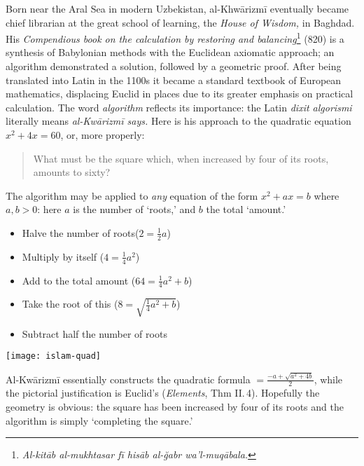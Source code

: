 	
Born near the Aral Sea in modern Uzbekistan, al-Khwārizmī eventually became chief librarian at the great school of learning, the \emph{House of Wisdom,} in Baghdad. His \emph{Compendious book on the calculation by restoring and balancing}\footnote{\emph{Al-kitāb al-mukhtasar fī hisāb al-ğabr wa’l-muqābala.}} (820) is a synthesis of Babylonian methods with the Euclidean axiomatic approach; an algorithm demonstrated a solution, followed by a geometric proof. After being translated into Latin in the 1100s it became a standard textbook of European mathematics, displacing Euclid in places due to its greater emphasis on practical calculation. The word \emph{algorithm} reflects its importance: the Latin \emph{dixit algorismi} literally means \emph{al-Kwārizmī says.} Here is his approach to the quadratic equation $x^2+4x=60$, or, more properly:
\begin{quote}
What must be the square which, when increased by four of its roots, amounts to sixty?
\end{quote}


\begin{minipage}[t]{0.7\linewidth}\vspace{-4pt}
The algorithm may be applied to \emph{any} equation of the form $x^2+ax=b$ where $a,b>0$: here $a$ is the number of `roots,' and $b$ the total `amount.'
\begin{itemize}\itemsep0pt
  \item Halve the number of roots\hfill \big($2=\frac 12a$\big)
  \item Multiply by itself \hfill \big($4=\frac 14a^2$\big)
  \item Add to the total amount \hfill \big($64=\frac 14a^2+b$\big)
  \item Take the root of this \hfill \Big($8=\sqrt{\frac 14a^2+b}$\Big)
  \item Subtract half the number of roots \hfill {}
\end{itemize}
\end{minipage}\hfill\begin{minipage}[t]{0.29\linewidth}\vspace{-3pt}
\flushright\texttt{[image: islam-quad]}
\end{minipage}\smallbreak
Al-Kwārizmī essentially constructs the quadratic formula $=\frac{-a+\sqrt{a^2+4b}}2$, while the pictorial justification is Euclid's (\emph{Elements}, Thm II.\,4). Hopefully the geometry is obvious: the square has been increased by four of its roots and the algorithm is simply `completing the square.'
\goodbreak


